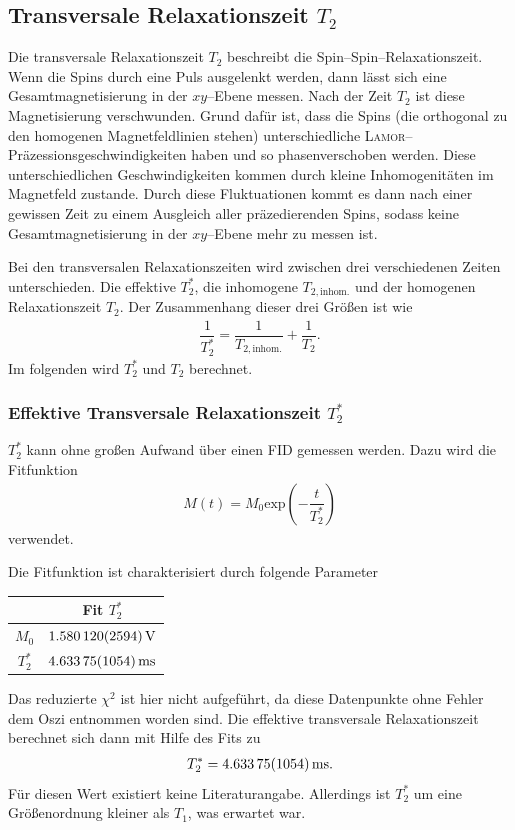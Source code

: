 \documentclass[10pt]{article}
\newenvironment{Figure}
  {\par\medskip\noindent\minipage{\linewidth}}
  {\endminipage\par\medskip}
\begin{document}
\begin{multicols}{2}
\subsection{Transversale Relaxationszeit $T_2$}
Die transversale Relaxationszeit $T_2$ beschreibt die Spin--Spin--Relaxationszeit.
Wenn die Spins durch eine Puls ausgelenkt werden, dann lässt sich eine Gesamtmagnetisierung in der $xy$--Ebene messen.
Nach der Zeit $T_2$ ist diese Magnetisierung verschwunden.
Grund dafür ist, dass die Spins (die orthogonal zu den homogenen Magnetfeldlinien stehen) unterschiedliche \textsc{Lamor}--Präzessionsgeschwindigkeiten haben und so phasenverschoben werden.
Diese unterschiedlichen Geschwindigkeiten kommen durch kleine Inhomogenitäten im Magnetfeld zustande.
Durch diese Fluktuationen kommt es dann nach einer gewissen Zeit zu einem Ausgleich aller präzedierenden Spins, sodass keine Gesamtmagnetisierung in der $xy$--Ebene mehr zu messen ist.

Bei den transversalen Relaxationszeiten wird zwischen drei verschiedenen Zeiten unterschieden.
Die effektive $T_2^*$, die inhomogene $T_{2,\text{inhom.}}$ und der homogenen Relaxationszeit $T_2$.
Der Zusammenhang dieser drei Größen ist wie
\begin{align} 
        \dfrac{1}{T_2^*}=\dfrac{1}{T_{2,\text{inhom.}}}+\dfrac{1}{T_2}
.\end{align} 
Im folgenden wird $T_2^*$ und $T_2$ berechnet.

\subsubsection{Effektive Transversale Relaxationszeit $T_2^*$}
$T_2^*$ kann ohne großen Aufwand über einen FID gemessen werden.
Dazu wird die Fitfunktion
\begin{align} 
        M\left(t\right)=M_0\text{exp}\left(-\dfrac{t}{T_2^*}\right)
\end{align} 
verwendet.
  \begin{Figure}
    \centering\resizebox{\textwidth}{!}{}
    \label{fig:T2eff}
  \end{Figure}
Die Fitfunktion ist charakterisiert durch folgende Parameter
  \begin{center}
    \begin{tabular}{c|c}
    & Fit $T_2^*$\\
    \hline
    $M_0$ & $\SI{1.58012+-0.002594}{V}$ \\
    $T_2^*$ & $\SI{4.63375+-0.01054}{ms}$ 
    \end{tabular}
  \label{Tab:PZG_para}
  \end{center}
Das reduzierte $\chi ^2$ ist hier nicht aufgeführt, da diese Datenpunkte ohne Fehler dem Oszi entnommen worden sind.
Die effektive transversale Relaxationszeit berechnet sich dann mit Hilfe des Fits zu
\begin{align} 
        T_2^*=\SI{4.63375+-0.01054}{ms}
.\end{align} 
Für diesen Wert existiert keine Literaturangabe.
Allerdings ist $T_2^*$ um eine Größenordnung kleiner als $T_1$, was erwartet war.


\end{multicols}
\end{document}
